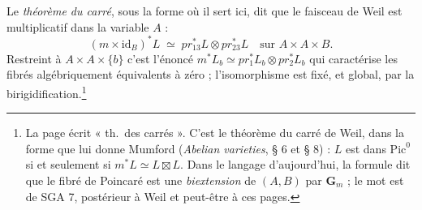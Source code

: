 \documentclass[11pt,a4paper]{article}
\begin{document}
Le \emph{théorème du carré}, sous la forme où il sert ici, dit que le
faisceau de Weil est multiplicatif dans la variable $A$ :
\[
  (m \times \mathrm{id}_B)^{*}L \;\simeq\; pr_{13}^{*}L \otimes pr_{23}^{*}L
  \quad \text{sur } A \times A \times B.
\]
Restreint à $A \times A \times \{b\}$ c'est l'énoncé $m^{*}L_b \simeq
pr_1^{*}L_b \otimes pr_2^{*}L_b$ qui caractérise les fibrés algébriquement
équivalents à zéro ; l'isomorphisme est fixé, et global, par la
birigidification.\footnote{La page écrit « th.\ des carrés ». C'est le
théorème du carré de Weil, dans la forme que lui donne Mumford
(\emph{Abelian varieties}, § 6 et § 8) : $L$ est dans $\mathrm{Pic}^{0}$ si
et seulement si $m^{*}L \simeq L \boxtimes L$. Dans le langage d'aujourd'hui,
la formule dit que le fibré de Poincaré est une \emph{biextension} de
$(A, B)$ par $\mathbf{G}_m$ ; le mot est de SGA 7, postérieur à Weil et
peut-être à ces pages.}
\end{document}
